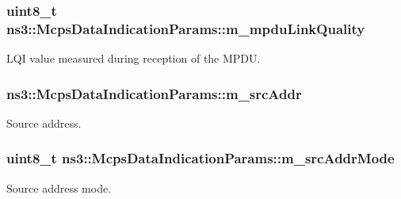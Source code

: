 \subsubsection[{\texorpdfstring{m\+\_\+mpdu\+Link\+Quality}{m_mpduLinkQuality}}]{\setlength{\rightskip}{0pt plus 5cm}uint8\+\_\+t ns3\+::\+Mcps\+Data\+Indication\+Params\+::m\+\_\+mpdu\+Link\+Quality}\hypertarget{structns3_1_1McpsDataIndicationParams_a5ecdfa006a055bc1bbf14fe4ac039c62}{}\label{structns3_1_1McpsDataIndicationParams_a5ecdfa006a055bc1bbf14fe4ac039c62}


L\+QI value measured during reception of the M\+P\+DU. 

\subsubsection[{\texorpdfstring{m\+\_\+src\+Addr}{m_srcAddr}}]{ ns3\+::\+Mcps\+Data\+Indication\+Params\+::m\+\_\+src\+Addr}\hypertarget{structns3_1_1McpsDataIndicationParams_afcfcb3e24abb4a6461d3b5b53bda6d64}{}\label{structns3_1_1McpsDataIndicationParams_afcfcb3e24abb4a6461d3b5b53bda6d64}


Source address. 

\subsubsection[{\texorpdfstring{m\+\_\+src\+Addr\+Mode}{m_srcAddrMode}}]{\setlength{\rightskip}{0pt plus 5cm}uint8\+\_\+t ns3\+::\+Mcps\+Data\+Indication\+Params\+::m\+\_\+src\+Addr\+Mode}\hypertarget{structns3_1_1McpsDataIndicationParams_ae2261f74b48defa0e8f73265ea8f097d}{}\label{structns3_1_1McpsDataIndicationParams_ae2261f74b48defa0e8f73265ea8f097d}


Source address mode. 

